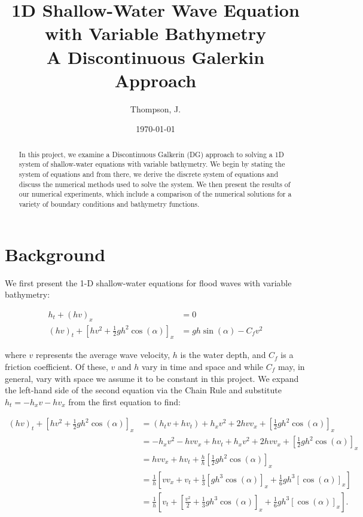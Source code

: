 \documentclass[letterpaper,11pt]{article}
\begin{document}
    \title{%
        1D Shallow-Water Wave Equation with Variable Bathymetry\\
        \large A Discontinuous Galerkin Approach
    }
    \author{%
        Thompson, J.
    }
    \date{\today}
    \maketitle

    \begin{abstract}
        In this project, we examine a Discontinuous Galkerin (DG) approach to solving a 1D system of shallow-water
        equations with variable bathymetry. We begin by stating the system of equations and from there, we derive the 
        discrete system of equations and discuss the numerical methods used to solve the system. We then present the 
        results of our numerical experiments, which include a comparison of the numerical solutions for a variety of
        boundary conditions and bathymetry functions.
    \end{abstract}

    \section{Background}\label{sec:background}

    We first present the 1-D shallow-water equations for flood waves with variable bathymetry\cite{whitham1999_ch3}:

    \begin{align*}
        h_t + (h v)_x &= 0 \\
        (h v)_t + \left[ hv^2 + \frac{1}{2} g h^2 \cos{(\alpha)} \right]_x &= g h \sin{(\alpha)} - C_f v^2
    \end{align*}

    where $v$ represents the average wave velocity, $h$ is the water depth, and $C_f$ is a friction
    coefficient. Of these, $v$ and $h$ vary in time and space and while $C_f$ may, in general, vary with space we assume
    it to be constant in this project. We expand the left-hand side of the second equation via the Chain Rule and 
    substitute $h_t = -h_x v - h v_x$ from the first equation to find: 
    
    \begin{align*}
        (h v)_t + \left[ hv^2 + \frac{1}{2} g h^2 \cos{(\alpha)} \right]_x 
            &= \left( h_t v + h v_t \right) + h_x v^2 + 2 h v v_x + \left[ \frac{1}{2} g h^2 \cos{(\alpha)} \right]_x \\
            &= -h_x v^2 - h v v_x + h v_t + h_x v^2 + 2 h v v_x + \left[ \frac{1}{2} g h^2 \cos{(\alpha)} \right]_x \\
            &=  h v v_x + h v_t + \frac{h}{h} \left[ \frac{1}{2} g h^2 \cos{(\alpha)} \right]_x \\
            &=  \frac{1}{h} \left[ v v_x + v_t + \frac{1}{3} \left[g h^3 \cos{(\alpha)} \right]_x + \frac{1}{6} g h^3 [\cos{(\alpha)}]_x \right] \\
            &=  \frac{1}{h} \left[ v_t + \left[ \frac{v^2}{2} + \frac{1}{3} g h^3 \cos{(\alpha)} \right]_x + \frac{1}{6} g h^3 [\cos{(\alpha)}]_x \right].
    \end{align*}
\end{document}
